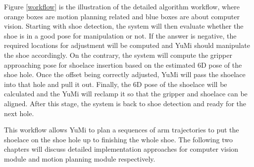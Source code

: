Figure \ref{workflow} is the illustration of the detailed algorithm workflow, where orange boxes are motion planning related and blue boxes are about computer vision. Starting with shoe detection, the system will then evaluate whether the shoe is in a good pose for manipulation or not. If the answer is negative, the required locations for adjustment will be computed and YuMi should manipulate the shoe accordingly. On the contrary, the system will compute the gripper approaching pose for shoelace insertion based on the estimated 6D pose of the shoe hole. Once the offset being correctly adjusted, YuMi will pass the shoelace into that hole and pull it out. Finally, the 6D pose of the shoelace will be calculated and the YuMi will reclamp it so that the gripper and shoelace can be aligned. After this stage, the system is back to shoe detection and ready for the next hole.

This workflow allows YuMi to plan a sequences of arm trajectories to put the shoelace on the shoe hole up to finishing the whole shoe. The following two chapters will discuss detailed implementation approaches for computer vision module and motion planning module respectively.